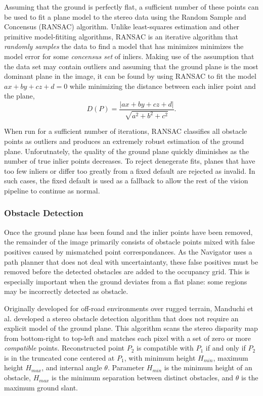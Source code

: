 \documentclass[twocolumn,11pt]{article}
\begin{document}
Assuming that the ground is perfectly flat, a sufficient number of these points
can be used to fit a plane model to the stereo data using the Random Sample and
Concensus (RANSAC) algorithm. Unlike least-squares estimation and other primitive
model-fititing algorithms, RANSAC is an iterative algorithm that \textit{randomly
samples} the data to find a model that has minimizes minimizes the model error
for some \textit{concensus set} of inliers. Making use of the assumption that the
data set may contain outliers and assuming that the ground plane is the most
dominant plane in the image, it can be found by using RANSAC to fit the model
$ax + by + cz + d = 0$ while minimizing the distance between each inlier point
and the plane,
\begin{equation*}
	D(P) = \frac{|ax + by + cz + d|}{\sqrt{a^2 + b^2 + c^2}}.
\end{equation*}

When run for a sufficient number of iterations, RANSAC classifies all obstacle
points as outliers and produces an extremely robust estimation of the ground
plane. Unforutnately, the quality of the ground plane quickly diminishes as the
number of true inlier points decreases. To reject denegerate fits, planes that
have too few inliers or differ too greatly from a fixed default are rejected
as invalid. In such cases, the fixed default is used as a fallback to allow
the rest of the vision pipeline to continue as normal.

\subsubsection{Obstacle Detection}
\label{sec:soft-stereo-od}
Once the ground plane has been found and the inlier points have been removed,
the remainder of the image primarily consists of obstacle points mixed with
false positives caused by mismatched point correspondances. As the Navigator
uses a path planner that does not deal with uncertaintanty, these false
positives must be removed before the detected obstacles are added to the
occupancy grid. This is especially important when the ground deviates from a
flat plane: some regions may be incorrectly detected as obstacle.

Originally developed for off-road environments over rugged terrain, Manduchi et
al. developed a stereo obstacle detection algorithm that does not require an
explicit model of the ground plane. This algorithm scans the stereo disparity
map from bottom-right to top-left and matches each pixel with a set of zero or
more \textit{compatible} points. Reconstructed point $P_2$ is compatible with
$P_1$ if and only if $P_2$ is in the truncated cone centered at $P_1$, with
minimum height $H_{min}$, maximum height $H_{max}$, and internal angle
$\theta$. Parameter $H_{min}$ is the minimum height of an obstacle, $H_{max}$
is the minimum separation between distinct obstacles, and $\theta$ is the
maximum ground slant.
\end{document}
